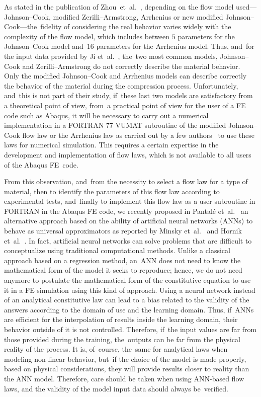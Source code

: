 \documentclass[algorithms,article,accept,pdftex,moreauthors]{Definitions/mdpi}
\begin{document}
As stated in the publication of \mbox{Zhou et~al.~\cite{Zhou-2020}}, depending on the flow model used---Johnson--Cook, modified Zerilli--Armstrong, Arrhenius or new modified Johnson--Cook---the~fidelity of considering the real behavior varies widely with the complexity of the flow model, which includes between $5$ parameters for the Johnson--Cook model and~$16$ parameters for the Arrhenius model.
Thus, and~for the input data provided by Ji et~al.~\cite{Ji-2018}, the~two most common models, Johnson--Cook and Zerilli--Armstrong do not correctly describe the material behavior.
Only the modified Johnson--Cook and Arrhenius models can describe correctly the behavior of the material during the compression process.
Unfortunately, and~this is not part of their study, if~these last two models are satisfactory from a theoretical point of view, from~a practical point of view for the user of a FE code such as Abaqus, it will be necessary to carry out a numerical implementation in a FORTRAN 77 VUMAT subroutine of the modified Johnson--Cook flow law or the Arrhenius law as carried out by a few authors~\cite{Liang-2022, Gao-2007-FRT, Ming-2018} to use these laws for numerical simulation.
This requires a certain expertise in the development and implementation of flow laws, which is not available to all users of the Abaqus FE~code.

From this observation, and~from the necessity to select a flow law for a type of material, then to identify the parameters of this flow law according to experimental tests, and~finally to implement this flow law as a user subroutine in FORTRAN in the Abaqus FE code, we recently proposed in Pantalé et~al.~\cite{Pantale-2021} an alternative approach based on the ability of artificial neural networks (ANNs) to behave as universal approximators as reported by Minsky et~al.~\cite{Minsky-1969} and Hornik et~al.~\cite{Hornik-1989}.
In fact, artificial neural networks can solve problems that are difficult to conceptualize using traditional computational methods.
Unlike a classical approach based on a regression method, an~ANN does not need to know the mathematical form of the model it seeks to reproduce; hence, we do not need anymore to postulate the mathematical form of the constitutive equation to use it in a FE simulation using this kind of approach.
Using a neural network instead of an analytical constitutive law can lead to a bias related to the validity of the answers according to the domain of use and the learning domain.
Thus, if~ANNs are efficient for the interpolation of results inside the learning domain, their behavior outside of it is not controlled.
Therefore, if~the input values are far from those provided during the training, the~outputs can be far from the physical reality of the process.
It is, of~course, the~same for analytical laws when modeling non-linear behavior, but~if the choice of the model is made properly, based on physical considerations, they will provide results closer to reality than the ANN model.
Therefore, care should be taken when using ANN-based flow laws, and the validity of the model input data should always be~verified.
\end{document}
